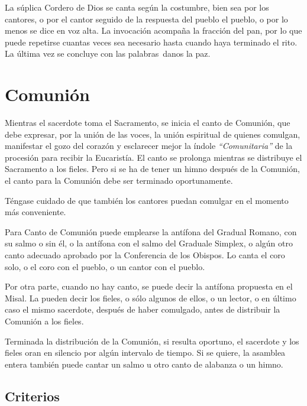 \documentclass[letterpaper, 12pt]{book}
\begin{document}
    La s\'uplica Cordero de Dios se canta seg\'un la costumbre, bien sea por los cantores, o por el cantor seguido de la respuesta del pueblo el pueblo, o por lo menos se dice en voz alta. La invocaci\'on acompa\~na la fracci\'on del pan, por lo que puede repetirse cuantas veces sea necesario hasta cuando haya terminado el rito. La \'ultima vez se concluye con las palabras danos la paz.
    
    \section{Comuni\'on}
    Mientras el sacerdote toma el Sacramento, se inicia el canto de Comuni\'on, que debe expresar, por la uni\'on de las voces, la uni\'on espiritual de quienes comulgan, manifestar el gozo del coraz\'on y esclarecer mejor la índole \textit{``Comunitaria''} de la procesi\'on para recibir la Eucarist\'ia. El canto se prolonga mientras se distribuye el Sacramento a los fieles. Pero si se ha de tener un himno despu\'es de la Comuni\'on, el canto para la Comuni\'on debe ser terminado oportunamente.\newline
    
    T\'engase cuidado de que tambi\'en los cantores puedan comulgar en el momento m\'as conveniente.\newline
    
    Para Canto de Comuni\'on puede emplearse la ant\'ifona del Gradual Romano, con su salmo o sin \'el, o la ant\'ifona con el salmo del Graduale Simplex, o alg\'un otro canto adecuado aprobado por la Conferencia de los Obispos. Lo canta el coro solo, o el coro con el pueblo, o un cantor con el pueblo.\newline
    
    Por otra parte, cuando no hay canto, se puede decir la ant\'ifona propuesta en el Misal. La pueden decir los fieles, o s\'olo algunos de ellos, o un lector, o en \'ultimo caso el mismo sacerdote, despu\'es de haber comulgado, antes de distribuir la Comuni\'on a los fieles.\newline
    
    Terminada la distribuci\'on de la Comuni\'on, si resulta oportuno, el sacerdote y los fieles oran en silencio por alg\'un intervalo de tiempo. Si se quiere, la asamblea entera tambi\'en puede cantar un salmo u otro canto de alabanza o un himno.
    
    \subsection{Criterios}
    
\end{document}
